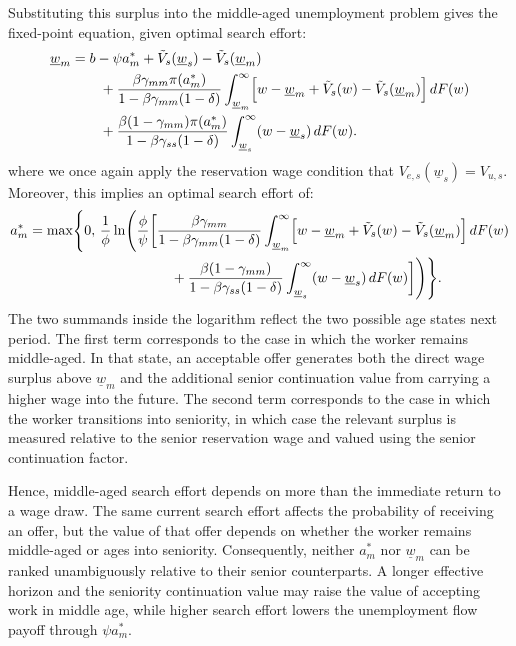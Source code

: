 \documentclass{article}
\newcommand{\lbar}[1]{\underline{#1}} %
\begin{document}
Substituting this surplus into the middle-aged unemployment problem gives the fixed-point equation, given optimal search effort:
\begin{align}
\lbar{w}_m
=
&\; b-\psi a_m^*
+\tilde V_s(\lbar w_s)-\tilde V_s(\lbar w_m)
\nonumber\\
&\quad
+\frac{\beta\gamma_{mm}\pi(a_m^*)}
{1-\beta\gamma_{mm}(1-\delta)}
\int_{\lbar{w}_m}^{\infty}
\Bigl[
w-\lbar{w}_m+\tilde V_s(w)-\tilde V_s(\lbar{w}_m)
\Bigr]\,dF(w)
\nonumber\\
&\quad
+\frac{\beta(1-\gamma_{mm})\pi(a_m^*)}
{1-\beta\gamma_{ss}(1-\delta)}
\int_{\lbar{w}_s}^{\infty}
(w-\lbar{w}_s)\,dF(w).
\label{eq:wm_fixed_point}
\end{align}
where we once again apply the reservation wage condition that $V_{e,s}(\lbar{w}_s)=V_{u,s}$. Moreover, this implies an optimal search effort of:
\begin{align*}
a_m^*
=
\max\Biggl\{
0,\,
\frac{1}{\phi}
\ln\Biggl(\frac{\phi}{\psi}\biggl[
&\frac{
\beta\gamma_{mm}}
{1-\beta\gamma_{mm}(1-\delta)}
\int_{\lbar{w}_m}^{\infty}
\Bigl[
w-\lbar{w}_m+\tilde V_s(w)-\tilde V_s(\lbar{w}_m)
\Bigr]\,dF(w)\\
&\quad
+\frac{\beta(1-\gamma_{mm})}
{1-\beta\gamma_{ss}(1-\delta)}
\int_{\lbar{w}_s}^{\infty}
(w-\lbar{w}_s)\,dF(w)
\biggr]\Biggr)
\Biggr\}.
\end{align*}
The two summands inside the logarithm reflect the two possible age states next period. The first term corresponds to the case in which the worker remains middle-aged. In that state, an acceptable offer generates both the direct wage surplus above $\lbar{w}_m$ and the additional senior continuation value from carrying a higher wage into the future. The second term corresponds to the case in which the worker transitions into seniority, in which case the relevant surplus is measured relative to the senior reservation wage and valued using the senior continuation factor.

Hence, middle-aged search effort depends on more than the immediate return to a wage draw. The same current search effort affects the probability of receiving an offer, but the value of that offer depends on whether the worker remains middle-aged or ages into seniority. Consequently, neither $a_m^*$ nor $\lbar w_m$ can be ranked unambiguously relative to their senior counterparts. A longer effective horizon and the seniority continuation value may raise the value of accepting work in middle age, while higher search effort lowers the unemployment flow payoff through $\psi a_m^*$.
\end{document}
